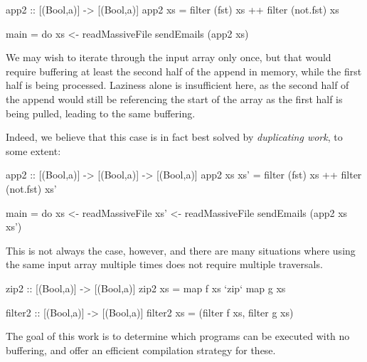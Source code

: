 \begin{code}
app2 :: [(Bool,a)] -> [(Bool,a)]
app2 xs
  = filter     (fst) xs
 ++ filter (not.fst) xs

main
  = do xs  <- readMassiveFile
       sendEmails (app2 xs)
\end{code}

We may wish to iterate through the input array only once, but that would require buffering at least the second half of the append in memory, while the first half is being processed.
Laziness alone is insufficient here, as the second half of the append would still be referencing the start of the array as the first half is being pulled, leading to the same buffering.

Indeed, we believe that this case is in fact best solved by \emph{duplicating work}, to some extent:

\begin{code}
app2 :: [(Bool,a)] -> [(Bool,a)] -> [(Bool,a)]
app2 xs xs'
  = filter     (fst) xs
 ++ filter (not.fst) xs'

main
  = do xs  <- readMassiveFile
       xs' <- readMassiveFile
       sendEmails (app2 xs xs')
\end{code}

This is not always the case, however, and there are many situations where using the same input array multiple times does not require multiple traversals.

\begin{code}
zip2 :: [(Bool,a)] -> [(Bool,a)]
zip2 xs
  = map f xs `zip` map g xs

filter2 :: [(Bool,a)] -> [(Bool,a)]
filter2 xs
  = (filter f xs, filter g xs)
\end{code}
The goal of this work is to determine which programs can be executed with no buffering, and offer an efficient compilation strategy for these.



